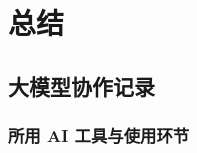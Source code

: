 \documentclass[withoutpreface,bwprint]{cumcmthesis}
\begin{document}
%

\newpage
\section{总结}

\subsection{大模型协作记录}

\subsubsection{所用 AI 工具与使用环节}
\end{document}
